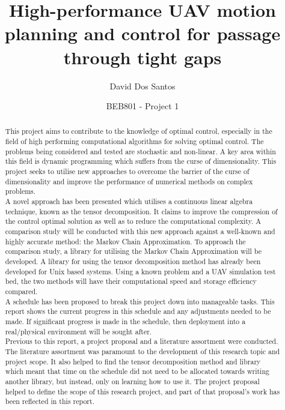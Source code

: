 \documentclass[11pt,draftd]{article}
\begin{document}
\title{High-performance UAV motion planning and control for passage through tight gaps}
\author{David Dos Santos}
\date{BEB801 - Project 1}
\maketitle

\[\]
\[\]
\[\]
\renewcommand{\abstractname}{Executive Summary}
\begin{abstract}
	\[\]
	This project aims to contribute to the knowledge of optimal control, especially in the field of high performing computational algorithms for solving optimal control. The problems being considered and tested are stochastic and non-linear. A key area within this field is dynamic programming which suffers from the curse of dimensionality. This project seeks to utilise new approaches to overcome the barrier of the curse of dimensionality and improve the performance of numerical methods on complex problems. \\
	
	\noindent A novel approach has been presented which utilises a continuous linear algebra technique, known as the tensor decomposition. It claims to improve the compression of the control optimal solution as well as to reduce the computational complexity. A comparison study will be conducted with this new approach against a well-known and highly accurate method: the Markov Chain Approximation. To approach the comparison study, a library for utilising the Markov Chain Approximation will be developed. A library for using the tensor decomposition method has already been developed for Unix based systems. Using a known problem and a UAV simulation test bed, the two methods will have their computational speed and storage efficiency compared. \\
	
	\noindent A schedule has been proposed to break this project down into manageable tasks. This report shows the current progress in this schedule and any adjustments needed to be made. If significant progress is made in the schedule, then deployment into a real/physical environment will be sought after. \\
	
	\noindent Previous to this report, a project proposal and a literature assortment were conducted. The literature assortment was paramount to the development of this research topic and project scope. It also helped to find the tensor decomposition method and library which meant that time on the schedule did not need to be allocated towards writing another library, but instead, only on learning how to use it. The project proposal helped to define the scope of this research project, and part of that proposal's work has been reflected in this report. \\
	

\end{abstract}
\end{document}
